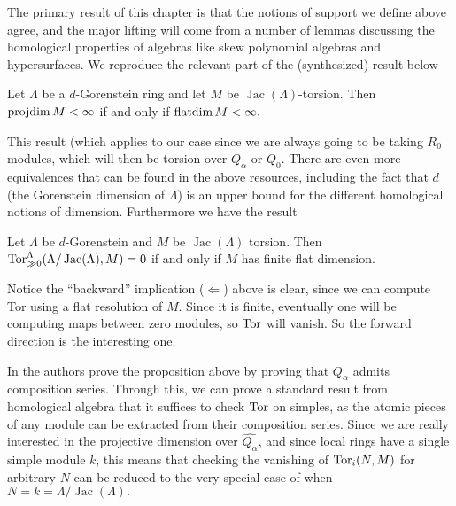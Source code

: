 \documentclass [11pt, proquest] {uwthesis}[2020/02/24]
\begin{document}
    The primary result of this chapter is that the notions of support we define above agree, and the major lifting will come from a number of lemmas discussing the homological properties of algebras like skew polynomial algebras and hypersurfaces. We reproduce the relevant part of the (synthesized) result below
    
    \begin{prop}\label{prop:homological-dims}
        Let $\Lambda$ be a $d$-Gorenstein ring and let $M$ be $\operatorname{Jac}(\Lambda)$-torsion. Then $\operatorname{projdim} M<\infty$ if and only if $\operatorname{flatdim} M<\infty.$
    \end{prop}
    This result (which applies to our case since we are always going to be taking $R_0$ modules, which will then be torsion over $Q_\alpha$ or $Q_0$. There are even more equivalences that can be found in the above resources, including the fact that $d$ (the Gorenstein dimension of $\Lambda$) is an upper bound for the different homological notions of dimension. Furthermore we have the result
    \begin{prop}\label{prop:flat-torsion-equiv}
        Let $\Lambda$ be $d$-Gorenstein and $M$ be $\operatorname{Jac}(\Lambda)$ torsion. Then 
        $\operatorname{Tor}_{\gg0}^\Lambda(\Lambda/\operatorname{Jac}(\Lambda),M)=0$ if and only if $M$ has finite flat dimension.
    \end{prop}
    \begin{rmk}
        Notice the ``backward'' implication ($\Leftarrow$) above is clear, since we can compute Tor using a flat resolution of $M$. Since it is finite, eventually one will be computing maps between zero modules, so $\operatorname{Tor}$ will vanish. So the forward direction is the interesting one. 
        
        In \cite[sec. 3.1]{negron-pevtsovaII} the authors prove the proposition above by proving that $Q_\alpha$ admits composition series. Through this, we can prove a standard result from homological algebra that it suffices to check $\operatorname{Tor}$ on simples, as the atomic pieces of any module can be extracted from their composition series. Since we are really interested in the projective dimension over $\widehat{Q_\alpha}$, and since local rings have a single simple module $k$, this means that checking the vanishing of $\operatorname{Tor}_i(N,M)$ for arbitrary $N$ can be reduced to the very special case of when $N=k=\Lambda/\operatorname{Jac}(\Lambda).$
    \end{rmk}
    
\end{document}
